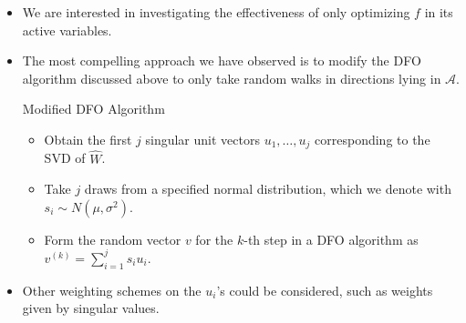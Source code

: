 \documentclass[11pt]{beamer}
\newcommand{\A}{\mathcal{A}}
\begin{document}
\begin{frame}

\begin{itemize}
	\item We are interested in investigating the effectiveness of only optimizing $f$ in its active variables.
	
	\item The most compelling approach we have observed is to modify the DFO algorithm discussed above to only take random walks in directions lying in $\A$.
	
	
	
	\begin{block}{Modified DFO Algorithm}
	
	\begin{itemize}
	
	
	\item Obtain the first $j$ singular unit vectors $u_1,\ldots,u_j$ corresponding to the SVD of $\hat{W}$.
	
	\item Take $j$ draws from a specified normal distribution, which we denote with $s_i\sim N(\mu,\sigma^2)$.
	
	\item Form the random vector $v$ for the $k$-th step in a DFO algorithm as $v^{(k)}=\sum_{i=1}^js_iu_i$.
	
	\end{itemize}
	
	\end{block}
	
	
	\item Other weighting schemes on the $u_i$'s could be considered, such as weights given by singular values.
	

	
\end{itemize}

\end{frame}




	


\end{document}
